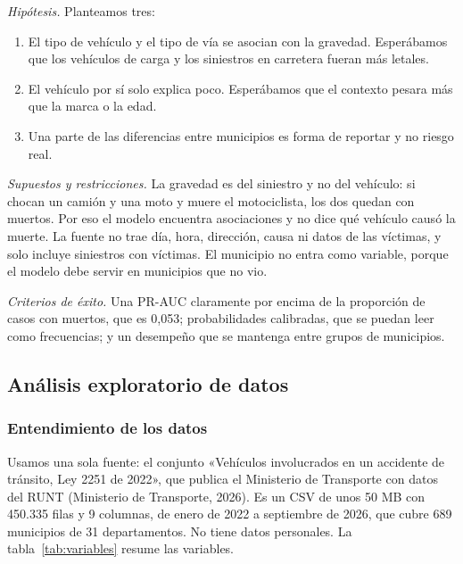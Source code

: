 \documentclass[11pt,a4paper]{article}
\begin{document}
\textit{Hipótesis.} Planteamos tres:

\begin{enumerate}
  \item El tipo de vehículo y el tipo de vía se asocian con la gravedad. Esperábamos que los vehículos de carga y los siniestros en carretera fueran más letales.
  \item El vehículo por sí solo explica poco. Esperábamos que el contexto pesara más que la marca o la edad.
  \item Una parte de las diferencias entre municipios es forma de reportar y no riesgo real.
\end{enumerate}

\textit{Supuestos y restricciones.} La gravedad es del siniestro y no del vehículo: si chocan un camión y una moto y muere el motociclista, los dos quedan con muertos. Por eso el modelo encuentra asociaciones y no dice qué vehículo causó la muerte. La fuente no trae día, hora, dirección, causa ni datos de las víctimas, y solo incluye siniestros con víctimas. El municipio no entra como variable, porque el modelo debe servir en municipios que no vio.

\textit{Criterios de éxito.} Una PR-AUC claramente por encima de la proporción de casos con muertos, que es 0,053; probabilidades calibradas, que se puedan leer como frecuencias; y un desempeño que se mantenga entre grupos de municipios.

\subsection{Análisis exploratorio de datos}

\subsubsection{Entendimiento de los datos}

Usamos una sola fuente: el conjunto «Vehículos involucrados en un accidente de tránsito, Ley 2251 de 2022», que publica el Ministerio de Transporte con datos del RUNT (Ministerio de Transporte, 2026). Es un CSV de unos 50 MB con 450.335 filas y 9 columnas, de enero de 2022 a septiembre de 2026, que cubre 689 municipios de 31 departamentos. No tiene datos personales. La tabla~\ref{tab:variables} resume las variables.
\end{document}
